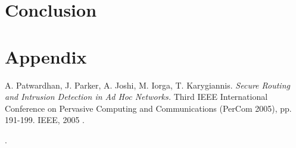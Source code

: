 \documentclass[a4paper,11pt]{article}
\begin{document}
\section{Conclusion}

\section{Appendix}


\footnotesize{  %
\begin{thebibliography}{N}

 A. Patwardhan, J. Parker, A. Joshi, M. Iorga, T. Karygiannis.
\textit{Secure Routing and Intrusion Detection in Ad Hoc Networks.}
Third IEEE International Conference on Pervasive Computing and Communications (PerCom 2005), pp. 191-199. IEEE, 2005 .


\end{thebibliography}.  
}
\end{document}
